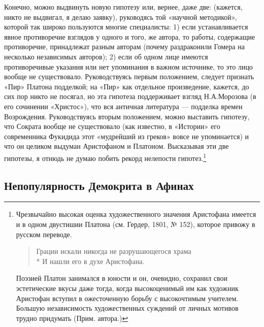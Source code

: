 Конечно,  можно  выдвинуть  новую  гипотезу  или,  вернее,  даже  две:
(кажется, никто не выдвигал, я  делаю заявку), руководясь той «научной
методикой»,  которой  так  широко пользуются  многие  специалисты:  1)
если  устанавливается явное  противоречие  взглядов у  одного и  того,
же  автора, то  работы,  содержащие  противоречие, принадлежат  разным
авторам (почему раздраконили Гомера на несколько независимых авторов);
2)  если  об  одном  лице  имеются  противоречивые  указания  или  нет
упоминания в  важном источнике,  то это  лицо вообще  не существовало.
Руководствуясь  первым  положением,  следует  признать  «Пир»  Платона
подделкой; на  «Пир» как отдельное  произведение, кажется, до  сих пор
никто не посягал, но эта  гипотеза поддерживает взгляд Н.А.Морозова (в
его  сочинении «Христос»),  что вся  античная литература  --- подделка
времен Возрождения. Руководствуясь  вторым положением, можно выставить
гипотезу,  что  Сократа  вообще   не  существовало  (как  известно,  в
«Истории» его  современника Фукидида этот «мудрейший  из греков» вовсе
не  упоминается) и  что  он целиком  выдуман  Аристофаном и  Платоном.
Высказывая эти две гипотезы, я отнюдь не думаю побить рекорд нелепости
гипотез.\footnote{Чрезвычайно высокая  оценка художественного значения
Аристофана имеется  и в одном  двустишии Платона (см. Гердер,  1801, №
152), которое привожу в русском переводе.

\begin{verse} Грации искали никогда не разрушающегося храма\\* И нашли
его в духе Аристофана. \end{verse}

Поэзией  Платон  занимался в  юности  и  он, очевидно,  сохранил  свои
эстетические  вкусы даже  тогда, когда  высокоценимый им  как художник
Аристофан  вступил  в  ожесточенную борьбу  с  высокочтимым  учителем.
Большую независимость художественных суждений от личных мотивов трудно
придумать (Прим. автора.)}

\subsection{Непопулярность Демокрита в Афинах}

